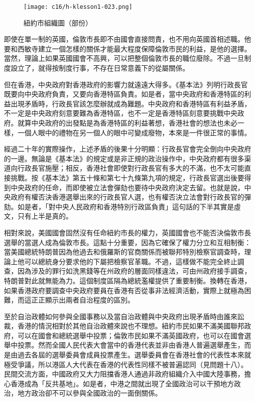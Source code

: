 \begin{figure}[htbp]
    \centering
    \texttt{[image: c16/h-klesson1-023.png]}
    \caption{紐約市組織圖（部份）} 
\end{figure}

即使在單一制的英國，倫敦市長即不由國會直接問責，也不用向英國首相述職。他要和西敏寺建立一個怎樣的關係才能最大程度保障倫敦市民的利益，是他的選擇。當然，理論上如果英國國會不高興，可以把整個倫敦市長的職位廢除。不過一旦制度設立了，就得按制度行事，不存在日常意義下的從屬關係。

但在香港，中央政府對香港政府的影響力就遠遠大得多。《基本法》列明行政長官既要向中央政府負責，又要向香港特區負責。如是者，當中央政府和香港特區的利益出現矛盾時，行政長官該怎麼辦就成為難題。中央政府和香港特區有利益矛盾，不一定是中央政府刻意要難為香港特區，也不一定是香港特區刻意要挑戰中央政府。就算中央政府的出發點是為香港特區的利益著想，香港社會的想法也未必一樣，一個人眼中的禮物在另一個人的眼中可變成廢物，本來是一件很正常的事情。

經過二十年的實際操作，上述矛盾的後果十分明顯：行政長官會完全倒向中央政府的一邊。無論是《基本法》的規定或是非正規的政治操作中，中央政府都有很多渠道向行政長官施壓；相反，香港社會即使對行政長官有多大的不滿，也不太可能直接挑戰。按《基本法》第五十條和第七十九條第九項的規定，行政長官選出後要得到中央政府的任命，而即使被立法會彈劾也要待中央政府決定去留。也就是說，中央政府有權否決香港選舉出來的行政長官人選，也有權否決立法會對行政長官的彈劾。如是者，「對中央人民政府和香港特別行政區負責」這句話的下半其實是虛文，只有上半是真的。

相對來說，美國國會固然沒有任命紐約市長的權力，英國國會也不能否決倫敦市長選舉的當選人成為倫敦市長。這點十分重要，因為它確保了權力分立和互相制衡：當美國總統特朗普因為他過去和俄羅斯的官商關係而被聯邦特別檢察官調查時，理論上他可以總統身分要求他的下屬把檢察官革職。不過，這樣做不能完全終止調查，因為涉及的罪行如洗黑錢等在州政府的層面同樣違法，可由州政府接手調查，特朗普對此就無能為力。這個制度區隔為總統濫權提供了重要制衡。換轉在香港，如果香港政府要調查中央政府要員在香港有否從事非法經濟活動，實際上就極為困難，而這正正顯示出兩者自治程度的區別。

至於自治政體如何參與全國事務以及當自治政體與中央政府出現矛盾時由誰來訟裁，香港的情況相對於其他自治政體來說也不理想。紐約市民如果不滿美國聯邦政府，可以在國會和總統選舉中投票；倫敦市民如果不滿英國政府，也可以在國會選舉中投票。然而全國人民代表大會當中的香港代表並非由香港人普遍選舉產生，而是由過去各屆的選舉委員會成員投票產生。選舉委員會在香港社會的代表性本來就極受爭議，所以港區人大代表在香港的代表性同樣不被普遍認同（見問題十八）。民間交流方面，中國政府又大力阻擋香港人通過非政府組織介入中國大陸事務，擔心香港成為「反共基地」。如是者，中港之間就出現了全國政治可以干預地方政治，地方政治卻不可以參與全國政治的一面倒關係。

